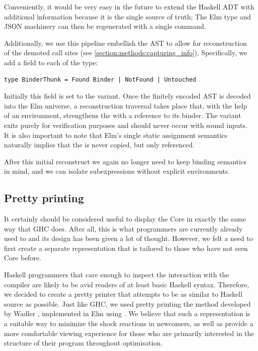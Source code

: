 Conveniently, it would be very easy in the future to extend the Haskell ADT with additional information
because it is the single source of truth; The Elm type and JSON machinery can then be regenerated with a single command.

Additionally, we use this pipeline embellish the AST to allow for reconstruction of the demoted call sites (see \cref{section:methods:capturing_info}).
Specifically, we add a field to each  of the type:

\begin{listing}[H]
\begin{verbatim}
type BinderThunk = Found Binder | NotFound | Untouched
\end{verbatim}
\end{listing}

Initially this field is set to the  variant. Once the finitely encoded AST is decoded into the 
Elm universe, a reconstruction traversal takes place that, with the help of an environment, strengthens the 
 with a reference to its binder. The  variant exits purely for verification purposes
and should never occur with sound inputs. It is also important to note that Elm's single static assignment
semantics naturally implies that the  is never copied, but only referenced.

After this initial reconstruct we again no longer need to keep binding semantics in mind, and we can isolate
subexpressions without explicit environments.

\subsection{Pretty printing}

It certainly should be considered useful to display the Core in exactly the same way that
GHC does. After all, this is what programmers are currently already used to and its design
has been given a lot of thought. However, we felt a need to first create a separate representation
that is tailored to those who have not seen Core before.

Haskell programmers that care enough to inspect the interaction with the compiler are likely to be
avid readers of at least basic Haskell syntax. Therefore, we decided to create a pretty printer that attempts
to be as similar to Haskell source as possible. Just like GHC, we used pretty printing the method developed 
by Wadler \cite{prettier_printer}, implemented in Elm using  \cite{prettier_printer_elm}.
We believe that such a representation is a suitable way to minimize the shock reactions in newcomers, as well as
provide a more comfortable viewing experience for those who are primarily interested in the structure of their program
throughout optimisation.

